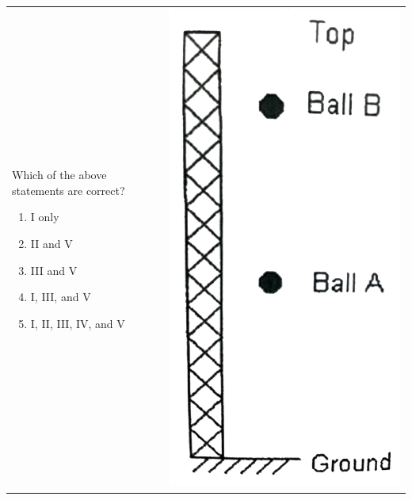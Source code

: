 \documentclass[12pt,letterpaper]{article}
\begin{document}
\begin{enumerate}
\begin{tabular}{l r}
\begin{minipage}{0.775\textwidth}
Which of the above statements are correct?
\begin{enumerate}
\item I only
\item II and V
\item III and V
\item I, III, and V
\item I, II, III, IV, and V
\end{enumerate}
\end{minipage} &
\begin{minipage}{0.125\textwidth}
\includegraphics[width=\textwidth]{tower.png}
\end{minipage}
\end{tabular}


\end{enumerate}
\end{document}
